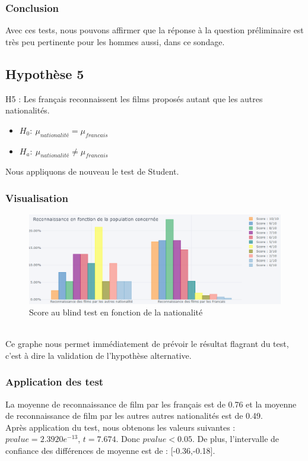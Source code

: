 \documentclass{article} %
\begin{document}
\subsubsection{Conclusion}
Avec ces tests, nous pouvons affirmer que la réponse à la question préliminaire est très peu pertinente pour les hommes aussi, dans ce sondage. 

\subsection{ Hypothèse 5}
H5 : Les français reconnaissent les films proposés autant que les autres nationalités.
\begin{itemize}
	\item $H_0: \ \mu_{nationalité} = \mu_{francais}$
	\item $H_a: \ \mu_{nationalité} \ne \mu_{francais}$
\end{itemize}
Nous appliquons de nouveau le test de Student.
\newpage
\subsubsection{Visualisation}
\begin{figure}[!h]
	\includegraphics[keepaspectratio,scale=0.6]{h5.png}
	\caption{Score au blind test en fonction de la nationalité}
\end{figure}~\\
Ce graphe nous permet immédiatement de prévoir le résultat flagrant du test, c’est à dire la validation de l’hypothèse alternative.
\subsubsection{ Application des test}
La moyenne de reconnaissance de film par les français est de 0.76 et la moyenne de reconnaissance de film par les autres autres nationalités est de 0.49.\\
Après application du test, nous obtenons les valeurs suivantes : $pvalue = 2.3920e^{-13}$, $t = 7.674$. Donc ${pvalue<0.05}$. De plus, l'intervalle de confiance des différences de moyenne est de : [-0.36,-0.18].
\end{document}
